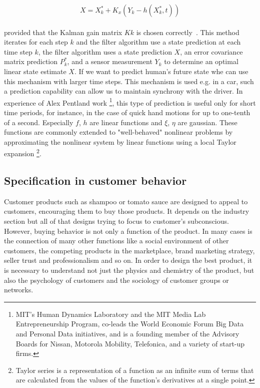 \begin{equation} \label{eq:3}
X = X_{k}^{*} + K_x(Y_k - h(X_{k}^{*},t))
\end{equation}
\\
provided that the Kalman gain matrix $Kk$ is chosen correctly~\cite{kalman}.
This method iterates for each step $k$ and the filter algorithm use a state prediction at each time step $k$,
the filter algorithm uses a state prediction $X$, an error covariance matrix prediction $P_k^*$,
and a sensor measurement $Y_k$ to determine an optimal linear state estimate $X$.
If we want to predict human's future state whe can use this mechanism with larger time steps.
This mechanism is used e.g. in a car, such a prediction capability can allow us to maintain synchrony with the driver.
In experience of Alex Pentland work \footnote{MIT's Human Dynamics Laboratory and the MIT Media Lab Entrepreneurship
Program, co-leads the World Economic Forum Big Data and Personal Data initiatives, and is a founding member
of the Advisory Boards for Nissan, Motorola Mobility, Telefonica, and a variety of start-up firms.}, this type of prediction
is useful only for short time periods, for instance, in the case of quick hand motions for up to one-tenth of a second.
Especially $f$, $h$ are linear functions and $\xi$, $\eta$ are gaussian.
These functions are commonly extended to "well-behaved" nonlinear problems by approximating the nonlinear system by linear functions
using a local Taylor expansion \footnote{Taylor series is a representation of a function as an infinite sum of terms that are calculated from
the values of the function's derivatives at a single point.}.

\subsection{Specification in customer behavior} \label{subsec:specification}
Customer products such as shampoo or tomato sauce are designed to appeal to customers, encouraging them to buy those products.
It depends on the industry section but all of that designs trying to focus to customer's subconscious.
However, buying behavior is not only a function of the product.
In many cases is the connection of many other functions like a social environment of other customers, the competing
products in the marketplace, brand marketing strategy, seller trust and professionalism and so on.
In order to design the best product, it is necessary to understand not just the physics and chemistry of the product,
but also the psychology of customers and the sociology of customer groups or networks.\cite{patel}

